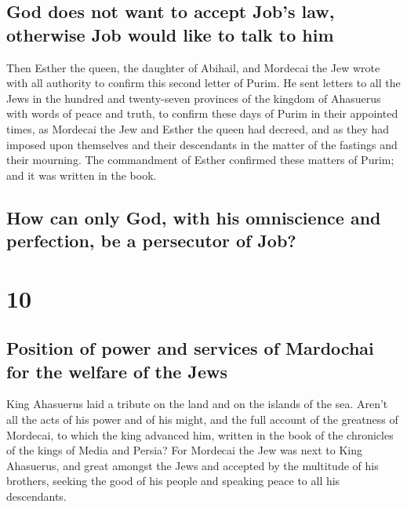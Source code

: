 \hypertarget{god-does-not-want-to-accept-jobs-law-otherwise-job-would-like-to-talk-to-him}{%
\subsection{God does not want to accept Job's law, otherwise Job would
like to talk to
him}\label{god-does-not-want-to-accept-jobs-law-otherwise-job-would-like-to-talk-to-him}}

 Then Esther the queen, the daughter of Abihail, and
Mordecai the Jew wrote with all authority to confirm this second letter
of Purim.  He sent letters to all the Jews in the hundred
and twenty-seven provinces of the kingdom of Ahasuerus with words of
peace and truth,  to confirm these days of Purim in their
appointed times, as Mordecai the Jew and Esther the queen had decreed,
and as they had imposed upon themselves and their descendants in the
matter of the fastings and their mourning.  The
commandment of Esther confirmed these matters of Purim; and it was
written in the book.

\hypertarget{how-can-only-god-with-his-omniscience-and-perfection-be-a-persecutor-of-job}{%
\subsection{How can only God, with his omniscience and perfection, be a
persecutor of
Job?}\label{how-can-only-god-with-his-omniscience-and-perfection-be-a-persecutor-of-job}}

\hypertarget{section-9}{%
\section{10}\label{section-9}}

\hypertarget{position-of-power-and-services-of-mardochai-for-the-welfare-of-the-jews}{%
\subsection{Position of power and services of Mardochai for the welfare
of the
Jews}\label{position-of-power-and-services-of-mardochai-for-the-welfare-of-the-jews}}

 King Ahasuerus laid a tribute on the land and on the
islands of the sea.  Aren't all the acts of his power and
of his might, and the full account of the greatness of Mordecai, to
which the king advanced him, written in the book of the chronicles of
the kings of Media and Persia?  For Mordecai the Jew was
next to King Ahasuerus, and great amongst the Jews and accepted by the
multitude of his brothers, seeking the good of his people and speaking
peace to all his descendants.
